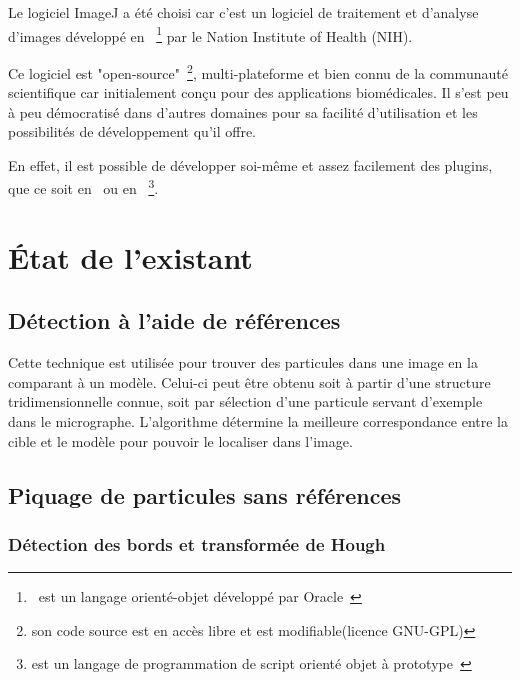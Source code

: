 \noindent
Le logiciel ImageJ a été choisi car c'est un logiciel de traitement et d'analyse d'images développé en \java~\footnote{\java\ est un langage orienté-objet développé par Oracle~\cite{java:url}} par le Nation Institute of Health (NIH).%

\noindent
Ce logiciel est "open-source"~\footnote{son code source est en accès libre et est modifiable(licence GNU-GPL)}, multi-plateforme et bien connu de la communauté scientifique car initialement conçu pour des applications biomédicales. Il s'est peu à peu démocratisé dans d'autres domaines pour sa facilité d'utilisation et les possibilités de développement qu'il offre.%

\noindent
En effet, il est possible de développer soi-même et assez facilement des plugins, que ce soit en \java\ ou en \js ~\footnote{\js est un langage de programmation de script orienté objet à prototype~\cite{javascript:url}}.

\section{\'Etat de l'existant}

\subsection{Détection à l'aide de références}

Cette technique est utilisée pour trouver des particules dans une image en la comparant à un modèle. Celui-ci peut \^etre obtenu soit à partir d'une structure tridimensionnelle connue, soit par sélection d'une particule servant d'exemple dans le micrographe. L'algorithme détermine la meilleure correspondance entre la cible et le modèle pour pouvoir le localiser dans l'image.%

\subsection{Piquage de particules sans références}

\subsubsection{Détection des bords et transformée de Hough}



